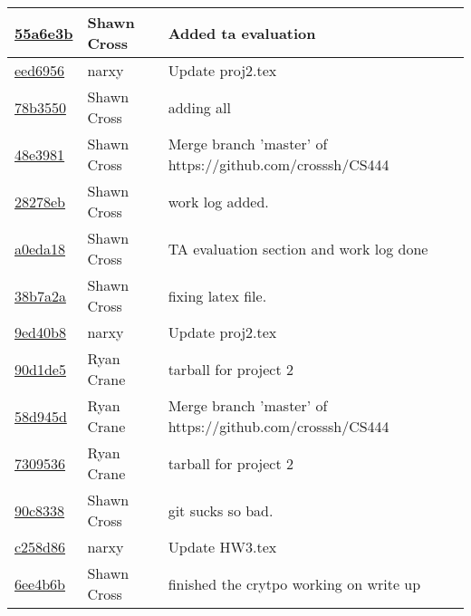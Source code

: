 \begin{tabular}{l l l}
\href{https://github.com/crosssh/CS444/commit/55a6e3ba04a8f8c3d043e52eb1bba93912be9971}{55a6e3b} & Shawn Cross & Added ta evaluation\\\hline
\href{https://github.com/crosssh/CS444/commit/eed6956b184fcf6d0991607a1cf420a68a4c341f}{eed6956} & narxy & Update proj2.tex\\\hline
\href{https://github.com/crosssh/CS444/commit/78b3550c2a5d3320acd46cbc6e9e187d67b37e76}{78b3550} & Shawn Cross & adding all\\\hline
\href{https://github.com/crosssh/CS444/commit/48e39812d35aa3db2ffac2fcccb2ee0382fbcbe1}{48e3981} & Shawn Cross & Merge branch 'master' of https://github.com/crosssh/CS444\\\hline
\href{https://github.com/crosssh/CS444/commit/28278eb1f821ec2c6c8617186f5780483206fe26}{28278eb} & Shawn Cross & work log added.\\\hline
\href{https://github.com/crosssh/CS444/commit/a0eda18a531921400766c13355c7ef2d14322757}{a0eda18} & Shawn Cross & TA evaluation section and work log done\\\hline
\href{https://github.com/crosssh/CS444/commit/38b7a2a398515679e2fdcc48855453ddf6c2b5bd}{38b7a2a} & Shawn Cross & fixing latex file.\\\hline
\href{https://github.com/crosssh/CS444/commit/9ed40b83f0debb4b70842309e75360f2e28b7f73}{9ed40b8} & narxy & Update proj2.tex\\\hline
\href{https://github.com/crosssh/CS444/commit/90d1de50b198916f6923122b7717a12fa764b3e1}{90d1de5} & Ryan Crane & tarball for project 2\\\hline
\href{https://github.com/crosssh/CS444/commit/58d945d09783e98b84371897149de6d86787299b}{58d945d} & Ryan Crane & Merge branch 'master' of https://github.com/crosssh/CS444\\\hline
\href{https://github.com/crosssh/CS444/commit/730953653ab00bd55699eef4f50f27252fe3d7b2}{7309536} & Ryan Crane & tarball for project 2\\\hline
\href{https://github.com/crosssh/CS444/commit/90c833816bad716ceedd20fe1b47ce2d5822b3e0}{90c8338} & Shawn Cross & git sucks so bad.\\\hline
\href{https://github.com/crosssh/CS444/commit/c258d8693943c8d485286b946f36b00db533652c}{c258d86} & narxy & Update HW3.tex\\\hline
\href{https://github.com/crosssh/CS444/commit/6ee4b6b1f3698e604beb00abe07b3988e9ab4f29}{6ee4b6b} & Shawn Cross & finished the crytpo working on write up\\\hline\end{tabular}
